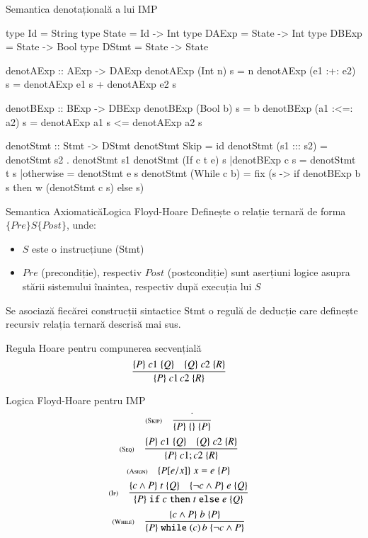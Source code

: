 \documentclass[xcolor=pdftex,romanian,colorlinks]{beamer}
\begin{document}
\begin{frame}[fragile]{Semantica denotațională a lui IMP}
\begin{minipage}{.46\columnwidth}
\begin{asciihs}
type Id = String
type State = Id -> Int
type DAExp = State -> Int
type DBExp = State -> Bool
type DStmt = State -> State

denotAExp :: AExp -> DAExp
denotAExp (Int n) s = n
denotAExp (e1 :+: e2) s
  = denotAExp e1 s
  + denotAExp e2 s

denotBExp :: BExp -> DBExp
denotBExp (Bool b) s = b
denotBExp (a1 :<=: a2) s
  = denotAExp a1 s
  <= denotAExp a2 s

\end{asciihs}
\end{minipage}
\begin{minipage}{.53\columnwidth}
\begin{asciihs}
denotStmt :: Stmt -> DStmt
denotStmt Skip = id
denotStmt (s1 ::: s2) =
  denotStmt s2 . denotStmt s1
denotStmt (If c t e) s
 |denotBExp c s = denotStmt t s
 |otherwise     = denotStmt e s
denotStmt (While c b) =
  fix (\w s ->
    if denotBExp b s
      then w (denotStmt c s)
      else s)
\end{asciihs}
\end{minipage}
\end{frame}

\begin{frame}{Semantica Axiomatică}{Logica Floyd-Hoare}
  Definește o relație ternară de forma
  $\{Pre\}S\{Post\}$, unde:
  \begin{itemize}
    \item $S$ este o instrucțiune (Stmt)
    \item $Pre$ (precondiție), respectiv $Post$ (postcondiție) sunt aserțiuni logice asupra stării sistemului înaintea, respectiv după execuția lui $S$
  \end{itemize}

  Se asociază fiecărei construcții sintactice Stmt o regulă de deducție care
definește recursiv relația ternară descrisă mai sus.

\begin{block}{Regula Hoare pentru compunerea secvențială}
\[\reg{\{P\}\;c1\, c2\;\{R\}}{\{P\}\;c1 \;\{Q\}\si\{Q\}\;c2\;\{R\}}{}\]
\end{block}
\end{frame}

\begin{frame}{Logica Floyd-Hoare pentru IMP}
\[\reg[Skip]{\{P\}\; \{\} \;\{P\}}{\cdot}{}\]
\vfill
\[\reg[Seq]{\{P\}\;c1 ; c2\;\{R\}}{\{P\}\;c1 \;\{Q\}\si\{Q\}\;c2\;\{R\}}{}\]
\vfill
\[\reg[Asign]{\{P[e/x]\}\;x = e\;\{P\}}{}{}\]
\vfill
\[\reg[If]{\{P\}\Sif c \Sthen t \Selse e\;\{Q\}}{\{c\wedge P\}\;t \;\{Q\}\si\{\neg c\wedge P\}\;e\;\{Q\}}{}\]
\vfill
\[\reg[While]{\{P\}\Swhile(c)\,b\;\{\neg c \wedge P\}}{\{c\wedge P\}\;b \;\{P\}}{}\]
\end{frame}
\end{document}
